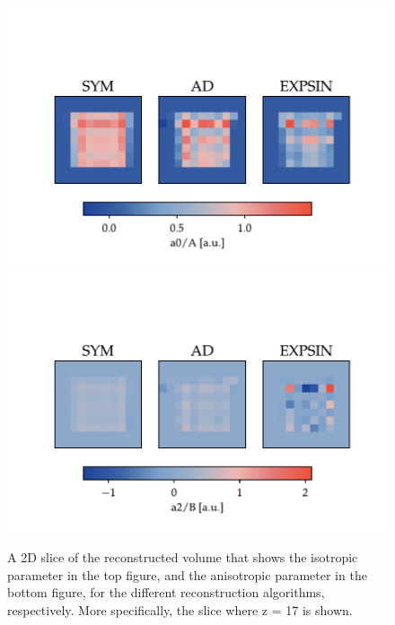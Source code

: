 
\begin{figure}[h!]
    \centering
    \includegraphics[trim={0 0cm 0 2.5cm},clip,width=1\textwidth]{./svg-inkscape/P_slices_A_svg-tex.pdf}
    \includegraphics[trim={0 0cm 0 2.5cm},clip,width=1\textwidth]{./svg-inkscape/P_slices_B_svg-tex.pdf}
    \caption{ A 2D slice of the reconstructed volume that shows the isotropic parameter in the top figure, and the anisotropic parameter in the bottom figure, for the different reconstruction algorithms, respectively.
        More specifically, the slice where z = 17 is shown.}
    \label{fig:phantom_reconstruction_2D}
\end{figure}

